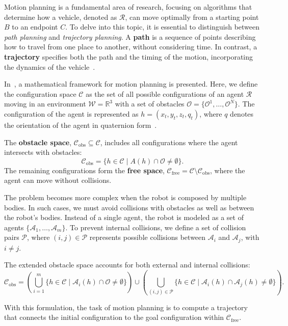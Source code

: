 Motion planning is a fundamental area of research, focusing on algorithms that determine how a vehicle, denoted as $\mathcal{R}$, can move optimally from a starting point $B$ to an endpoint $C$. To delve into this topic, it is essential to distinguish between \textit{path planning} and \textit{trajectory planning}. A \textbf{path} is a sequence of points describing how to travel from one place to another, without considering time. In contrast, a \textbf{trajectory} specifies both the path and the timing of the motion, incorporating the dynamics of the vehicle~\cite{wolek2017model}.

In~\cite{lavalle2006planning}, a mathematical framework for motion planning is presented. Here, we define the configuration space $\mathcal{C}$ as the set of all possible configurations of an agent $\mathcal{R}$ moving in an environment $\mathcal{W} = \mathbb{R}^3$ with a set of obstacles $\mathcal{O} = \{\mathcal{O}^1, \dots, \mathcal{O}^N\}$. The configuration of the agent is represented as $h = (x_t, y_t, z_t, q_t)$, where $q$ denotes the orientation of the agent in quaternion form~\cite{trawny2005indirect}.

The \textbf{obstacle space}, $\mathcal{C}_{\text{obs}} \subseteq \mathcal{C}$, includes all configurations where the agent intersects with obstacles:
\[
\mathcal{C}_{\text{obs}} = \{ h \in \mathcal{C} \mid A(h) \cap \mathcal{O} \neq \emptyset \}.
\]
The remaining configurations form the \textbf{free space}, $\mathcal{C}_{\text{free}} = \mathcal{C} \setminus \mathcal{C}_{\text{obs}}$, where the agent can move without collisions.

The problem becomes more complex when the robot is composed by multiple bodies. In such cases, we must avoid collisions with obstacles as well as between the robot's bodies. Instead of a single agent, the robot is modeled as a set of agents $\{\mathcal{A}_1, \dots, \mathcal{A}_m\}$. To prevent internal collisions, we define a set of collision pairs $\mathcal{P}$, where $(i, j) \in \mathcal{P}$ represents possible collisions between $\mathcal{A}_i$ and $\mathcal{A}_j$, with $i \neq j$.

The extended obstacle space accounts for both external and internal collisions:
\[
\mathcal{C}_{\text{obs}} = \left( \bigcup_{i=1}^m \{h \in \mathcal{C} \mid \mathcal{A}_i(h) \cap \mathcal{O} \neq \emptyset\} \right) \cup \left( \bigcup_{(i, j) \in \mathcal{P}} \{h \in \mathcal{C} \mid \mathcal{A}_i(h) \cap \mathcal{A}_j(h) \neq \emptyset\} \right).
\]

With this formulation, the task of motion planning is to compute a trajectory that connects the initial configuration to the goal configuration within $\mathcal{C}_{\text{free}}$.

